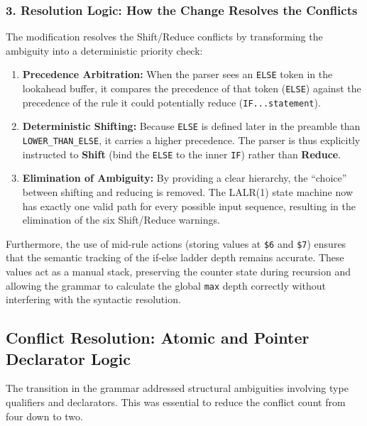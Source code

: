 \documentclass[a4paper,12pt]{article}
\begin{document}
\subsubsection*{3. Resolution Logic: How the Change Resolves the Conflicts}
The modification resolves the Shift/Reduce conflicts by transforming the ambiguity into a deterministic priority check:

\begin{enumerate}
    \item \textbf{Precedence Arbitration:} When the parser sees an \texttt{ELSE} token in the lookahead buffer, it compares the precedence of that token (\texttt{ELSE}) against the precedence of the rule it could potentially reduce (\texttt{IF...statement}).
    \item \textbf{Deterministic Shifting:} Because \texttt{ELSE} is defined later in the preamble than \texttt{LOWER\_THAN\_ELSE}, it carries a higher precedence. The parser is thus explicitly instructed to \textbf{Shift} (bind the \texttt{ELSE} to the inner \texttt{IF}) rather than \textbf{Reduce}.
    \item \textbf{Elimination of Ambiguity:} By providing a clear hierarchy, the ``choice'' between shifting and reducing is removed. The LALR(1) state machine now has exactly one valid path for every possible input sequence, resulting in the elimination of the six Shift/Reduce warnings.
\end{enumerate}

Furthermore, the use of mid-rule actions (storing values at \texttt{\$6} and \texttt{\$7}) ensures that the semantic tracking of the if-else ladder depth remains accurate. These values act as a manual stack, preserving the counter state during recursion and allowing the grammar to calculate the global \texttt{max} depth correctly without interfering with the syntactic resolution.






\subsection{Conflict Resolution: Atomic and Pointer Declarator Logic}

The transition in the grammar addressed structural ambiguities involving type qualifiers and declarators. This was essential to reduce the conflict count from four down to two.
\end{document}
